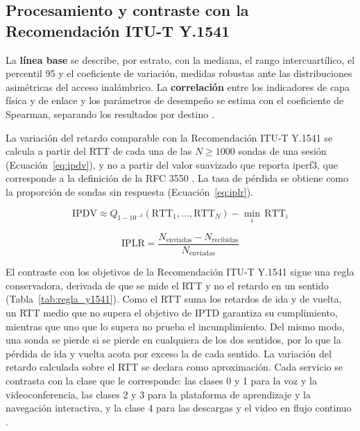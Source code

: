 \subsection{Procesamiento y contraste con la Recomendación ITU-T Y.1541}

La \textbf{línea base} se describe, por estrato, con la mediana, el rango intercuartílico, el percentil 95 y el coeficiente de variación, medidas robustas ante las distribuciones asimétricas del acceso inalámbrico. La \textbf{correlación} entre los indicadores de capa física y de enlace y los parámetros de desempeño se estima con el coeficiente de Spearman, separando los resultados por destino \cite{hollander2014nonparametric}.

La variación del retardo comparable con la Recomendación ITU-T Y.1541 se calcula a partir del RTT de cada una de las $N \geq 1000$ sondas de una sesión (Ecuación~\ref{eq:ipdv}), y no a partir del valor suavizado que reporta iperf3, que corresponde a la definición de la RFC 3550 \cite{ituy1541,rfc3550}. La tasa de pérdida se obtiene como la proporción de sondas sin respuesta (Ecuación~\ref{eq:iplr}).

\begin{equation}
\label{eq:ipdv}
\mathrm{IPDV} \approx Q_{1-10^{-3}}\left(\mathrm{RTT}_1, \dots, \mathrm{RTT}_N\right) - \min_{i}\, \mathrm{RTT}_i
\end{equation}

\begin{equation}
\label{eq:iplr}
\mathrm{IPLR} = \frac{N_{\text{enviadas}} - N_{\text{recibidas}}}{N_{\text{enviadas}}}
\end{equation}

El contraste con los objetivos de la Recomendación ITU-T Y.1541 sigue una regla conservadora, derivada de que se mide el RTT y no el retardo en un sentido (Tabla~\ref{tab:regla_y1541}). Como el RTT suma los retardos de ida y de vuelta, un RTT medio que no supera el objetivo de IPTD garantiza su cumplimiento, mientras que uno que lo supera no prueba el incumplimiento. Del mismo modo, una sonda se pierde si se pierde en cualquiera de los dos sentidos, por lo que la pérdida de ida y vuelta acota por exceso la de cada sentido. La variación del retardo calculada sobre el RTT se declara como aproximación. Cada servicio se contrasta con la clase que le corresponde: las clases 0 y 1 para la voz y la videoconferencia, las clases 2 y 3 para la plataforma de aprendizaje y la navegación interactiva, y la clase 4 para las descargas y el video en flujo continuo \cite{ituy1541}.

